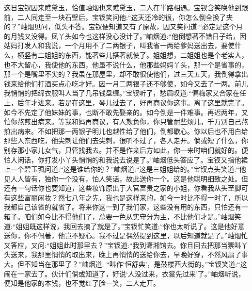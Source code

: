 \begin{parag}
    这日宝钗因来瞧黛玉，恰值岫烟也来瞧黛玉，二人在半路相遇。宝钗含笑唤他到跟前，二人同走至一块石壁后，宝钗笑问他:“这天还冷的很，你怎么倒全换了夹的？”岫烟见问，低头不答。宝钗便知道又有了原故，因又笑问道:“必定是这个月的月钱又没得。凤丫头如今也这样没心没计了。”岫烟道:“他倒想著不错日子给，因姑妈打发人和我说，一个月用不了二两银子，叫我省一两给爹妈送出去，要使什么，横竖有二姐姐的东西，能著些儿搭著就使了。姐姐想，二姐姐也是个老实人，也不大留心，我使他的东西，他虽不说什么，他那些妈妈丫头，那一个是省事的，那一个是嘴里不尖的？我虽在那屋里，却不敢很使他们，过三天五天，我倒得拿出钱来给他们打酒买点心吃才好。因一月二两银子还不够使，如今又去了一两。前儿我悄悄的把绵衣服叫人当了几吊钱盘缠。”宝钗听了，愁眉叹道:“偏梅家又合家在任上，后年才进来。若是在这里，琴儿过去了，好再商议你这事。离了这里就完了。如今不先定了他妹妹的事，也断不敢先娶亲的。如今倒是一件难事。再迟两年，又怕你熬煎出病来。等我和妈再商议，有人欺负你，你只管耐些烦儿，千万别自己熬煎出病来。不如把那一两银子明儿也越性给了他们，倒都歇心。你以后也不用白给那些人东西吃，他尖刺让他们去尖刺，很听不过了，各人走开。倘或短了什么，你别存那小家儿女气，只管找我去。并不是作亲后方如此，你一来时咱们就好的。便怕人闲话，你打发小丫头悄悄的和我说去说是了。”岫烟低头答应了。宝钗又指他裙上一个碧玉珮问道:“这是谁给你的？”岫烟道:“这是三姐姐给的。”宝钗点头笑道:“他见人人皆有，独你一个没有，怕人笑话，故此送你一个。这是他聪明细致之处。但还有一句话你也要知道，这些妆饰原出于大官富贵之家的小姐，你看我从头至脚可有这些富丽闲妆？然七八年之先，我也是这样来的，如今一时比不得一时了，所以我都自己该省的就省了。将来你这一到了我们家，这些没有用的东西，只怕还有一箱子。咱们如今比不得他们了，总要一色从实守分为主，不比他们才是。”岫烟笑道:“姐姐既这样说，我回去摘了就是了。”宝钗忙笑道:“你也太听说了。这是他好意送你，你不佩著，他岂不疑心。我不过是偶然提到这里，以后知道就是了。”岫烟忙又答应，又问:“姐姐此时那里去？”宝钗道:“我到潇湘馆去。你且回去把那当票叫丫头送来，我那里悄悄的取出来，晚上再悄悄的送给你去，早晚好穿，不然风扇了事大。但不知当在那里了？”岫烟道: “叫作‘恒舒典’，是鼓楼西大街的。”宝钗笑道:“这闹在一家去了。伙计们倘或知道了，好说‘人没过来，衣裳先过来’了。”岫烟听说，便知是他家的本钱，也不觉红了脸一笑，二人走开。
\end{parag}


